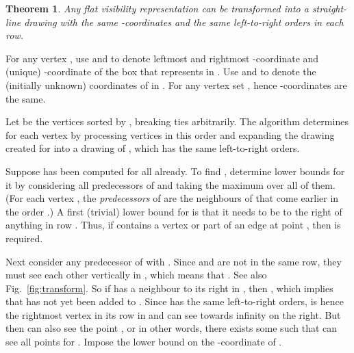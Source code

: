 \documentclass{elsarticle}
\newtheorem{theorem}{Theorem}
\newenvironment{proof}{{\bf Proof: }}{\hspace*{\fill}\medskip}
\begin{document}
\begin{theorem}
\label{thm:VR2SL}
\label{thm:VR_SL}
\label{th:VR2SL}
Any flat visibility representation  can be transformed into a 
straight-line drawing  with the same -coordinates
and the same left-to-right orders in each row.
\end{theorem}
\begin{proof}
For any vertex , use  and  to denote leftmost and
rightmost -coordinate and (unique) -coordinate of the box that 
represents  in .   
Use  and  to denote
the (initially unknown) coordinates of  in . 
For any vertex set , hence -coordinates are the same.

Let  be the vertices sorted by , breaking ties
arbitrarily. The algorithm determines  for each vertex by 
processing vertices in 
this order and expanding the drawing  created for 
 into a drawing  of ,
which has the same left-to-right orders. 

Suppose  has been computed for all  already.  To find
, determine lower bounds for it by considering all predecessors
of  and taking the maximum over all of them.  
(For each vertex , the {\em predecessors}
of  are the neighbours of  that come earlier in the order
.) A first (trivial)
lower bound for  is that it needs to be to the right of
anything in row .  Thus, if 
contains a vertex
or part of an edge at point , then  is required.

Next consider any predecessor  of  with .  
Since  and  are not in the same row, they must see each other
vertically in , which means that .
See also Fig.~\ref{fig:transform}.
So if  has a neighbour  to its right in , then
, which implies that 
 has not yet been added to .  Since 
has the same left-to-right orders,  is hence the rightmost
vertex in its row in  and can see towards infinity on the
right.  But then  can also see the point , or
in other words, there exists some  such that  can see all
points  for .  
Impose the lower bound  on the
-coordinate of .


\end{proof}
\end{document}
